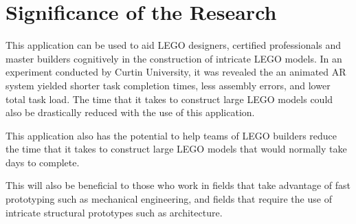 \section{Significance of the Research}
\label{sec:significance}

\label{sec:significance}
This application can be used to aid LEGO designers, certified professionals and master builders cognitively in the construction of intricate LEGO models. In an experiment conducted by Curtin University, it was revealed the an animated AR system yielded shorter task completion times, less assembly errors, and lower total task load\cite{HouWangBernold2013}. 
The time that it takes to construct large LEGO models could also be drastically reduced with the use of this application. 

This application also has the potential to help teams of LEGO builders reduce the time that it takes to construct large LEGO models that would normally take days to complete.

This will also be beneficial to those who work in fields that take advantage of fast prototyping such as mechanical engineering, and fields that require the use of intricate structural prototypes such as architecture.

\begin{comment}
If applicable, describe possible commercialization and/or innovation in your research.
\end{comment}


